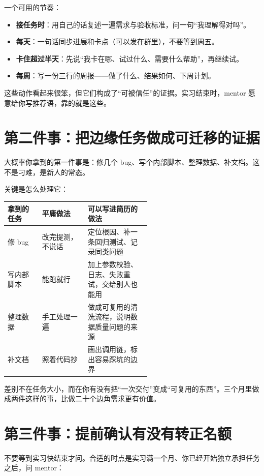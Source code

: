 \documentclass[UTF8,zihao=5,openany]{ctexbook}
\begin{document}
一个可用的节奏：

\begin{itemize}
\item \textbf{接任务时}：用自己的话复述一遍需求与验收标准，问一句“我理解得对吗”。
\item \textbf{每天}：一句话同步进展和卡点（可以发在群里），不要等到周五。
\item \textbf{卡住超过半天}：先说“我卡在哪、试过什么、需要什么帮助”，再继续试。
\item \textbf{每周}：写一份三行的周报——做了什么、结果如何、下周计划。
\end{itemize}

这些动作看起来很笨，但它们构成了“可被信任”的证据。实习结束时，mentor 愿意给你写推荐语，靠的就是这些。

\section{第二件事：把边缘任务做成可迁移的证据}
大概率你拿到的第一件事是：修几个 bug、写个内部脚本、整理数据、补文档。这不是刁难，是新人的常态。

关键是怎么处理它：

\begin{center}\small
\begin{tabularx}{\linewidth}{p{0.24\linewidth}p{0.32\linewidth}Y}
\toprule
拿到的任务 & 平庸做法 & 可以写进简历的做法 \\
\midrule
修 bug & 改完提测，不说话 & 定位根因、补一条回归测试、记录同类问题 \\
写内部脚本 & 能跑就行 & 加上参数校验、日志、失败重试，交给别人也能用 \\
整理数据 & 手工处理一遍 & 做成可复用的清洗流程，说明数据质量问题的来源 \\
补文档 & 照着代码抄 & 画出调用链，标出容易踩坑的边界 \\
\bottomrule
\end{tabularx}
\end{center}

差别不在任务大小，而在你有没有把“一次交付”变成“可复用的东西”。三个月里做成两件这样的事，比做二十个边角需求更有价值。

\section{第三件事：提前确认有没有转正名额}
不要等到实习快结束才问。合适的时点是实习满一个月、你已经开始独立承担任务之后，问 mentor：
\end{document}

